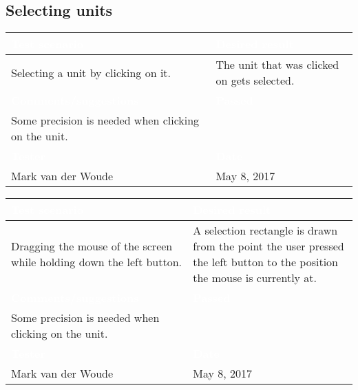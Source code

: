 \subsection{Selecting units}

\begin{tabularx}{\textwidth}{|X|X|}
\hline
\rowcolor{lightgray}\textcolor{white}{\textbf{Test scenario}} &
\textcolor{white}{\textbf{Desired result}}       
\\\hline
Selecting a unit by clicking on it. & The unit that was clicked on gets selected.       
\\\hline
\rowcolor{lightgray}\textcolor{white}{\textbf{Comments/suggestions}} & 
\textcolor{white}{\textbf{Passed}}
\\\hline
Some precision is needed when clicking on the unit. & \cellcolor{green}                      
\\\hline
\rowcolor{lightgray}\textcolor{white}{\textbf{Tester}} & 
\textcolor{white}{\textbf{Date}}               
\\\hline
Mark van der Woude & May 8, 2017                               		 
\\\hline
\end{tabularx}

\begin{tabularx}{\textwidth}{|X|X|}
\hline
\rowcolor{lightgray}\textcolor{white}{\textbf{Test scenario}} &
\textcolor{white}{\textbf{Desired result}}       
\\\hline
Dragging the mouse of the screen while holding down the left button. & A selection rectangle is drawn from the point the user pressed the left button to the position the mouse is currently at.       
\\\hline
\rowcolor{lightgray}\textcolor{white}{\textbf{Comments/suggestions}} & 
\textcolor{white}{\textbf{Passed}}
\\\hline
Some precision is needed when clicking on the unit. & \cellcolor{green}                      
\\\hline
\rowcolor{lightgray}\textcolor{white}{\textbf{Tester}} & 
\textcolor{white}{\textbf{Date}}               
\\\hline
Mark van der Woude & May 8, 2017                               		 
\\\hline
\end{tabularx}

